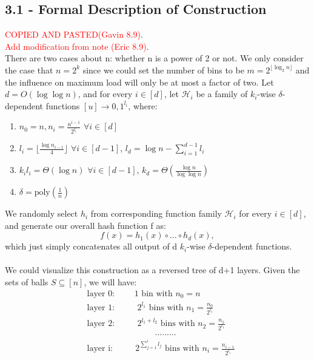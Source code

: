 \documentclass[letterpaper]{article} %
\begin{document}
	\subsection{3.1 - Formal Description of Construction}
	\textcolor{red}{COPIED AND PASTED(Gavin 8.9)}. \\
	\textcolor{red}{Add modification from note (Eric 8.9)}. \\
	There are two cases about n: whether n is a power of 2 or not. We only consider the case that $n=2^k$ since we could set the number of bins to be $m = 2^{\lfloor\log_2n\rfloor}$ and the influence on maximum load will only be at most a factor of two. Let $d=O(\log\log n)$, and for every $i\in [d]$, let $\mathscr{H}_i$ be a family of $k_i$-wise $\delta$-dependent functions $[u]\rightarrow{0,1}^{l_i}$, where:
	\begin{enumerate}
		\item $n_0 = n, n_i = \frac{n^{i-1}}{2^{l_i}}$ $\forall i\in [d]$
		\item $l_i = \lfloor\frac{\log n_{i-1}}{4}\rfloor$ $\forall i\in [d-1]$, $l_d = \log n - \sum_{i=1}^{d-1}l_i$
		\item $k_il_i = \Theta(\log n)$ $\forall i\in [d-1]$, $k_d = \Theta(\frac{\log n}{\log\log n})$
		\item $\delta = \text{poly}(\frac1n)$
	\end{enumerate}
	 We randomly select $h_i$ from corresponding function family $\mathscr{H}_i$ for every $i\in [d]$, and generate our overall hash function f as:
	$$f(x) = h_1(x) \circ ... \circ h_d(x),$$
	which just simply concatenates all output of d $k_i$-wise $\delta$-dependent functions.\\\\
	We could visualize this construction as a reversed tree of d+1 layers. Given the sets of balls $S\subseteq[n]$, we will have:
	\begin{align*}
	&\text{layer 0:$\qquad$ 1 bin with }n_0 = n\\
	&\text{layer 1:$\qquad$ }2^{l_1}\text{ bins with } n_1 = \frac{n_0}{2^{l_1}}\\
	&\text{layer 2:$\qquad$ }2^{l_1+l_2}\text{ bins with }n_2 = \frac{n_1}{2^{l_1}}\\
	&\qquad\qquad\qquad\qquad.........\\
	&\text{layer i:$\qquad$ }2^{\sum_{j=1}^{i}l_j}\text{ bins with }n_i = \frac{n_{i-1}}{2^{l_i}}
	\end{align*}
\end{document}
